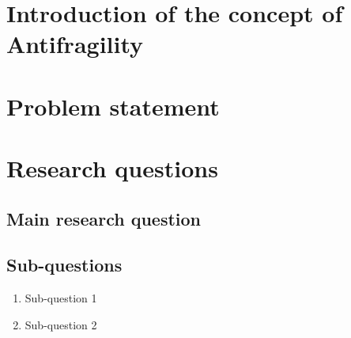 \section{Introduction of the concept of Antifragility}
\label{sec:introantifragility}

\section{Problem statement}
\label{sec:problemstatement}

\section{Research questions}
\label{sec:research-questions}

\subsection{Main research question}
\label{sub:main-research-question}
\begin{center}

\end{center}

\subsection{Sub-questions}
\label{sub:sub-questions}

\begin{enumerate}
	\item{Sub-question 1}
	\item{Sub-question 2}
\end{enumerate}
